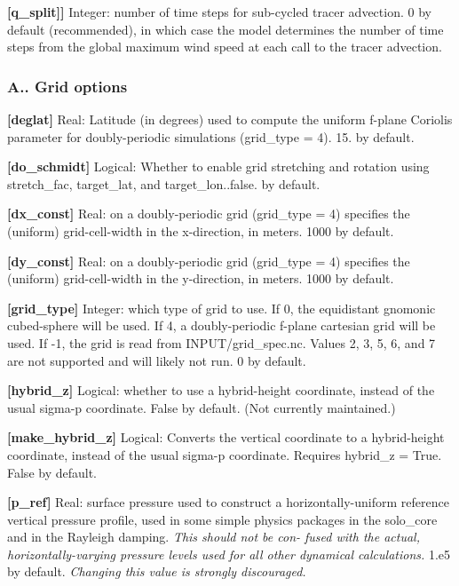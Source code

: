 {\bfseries \mbox{[}q\+\_\+split\mbox{]}\mbox{]}} Integer\+: number of time steps for sub-\/cycled tracer advection. 0 by default (recommended), in which case the model determines the number of time steps from the global maximum wind speed at each call to the tracer advection.

\subsubsection*{A.. Grid options}

{\bfseries \mbox{[}deglat\mbox{]}} Real\+: Latitude (in degrees) used to compute the uniform f-\/plane Coriolis parameter for doubly-\/periodic simulations (grid\+\_\+type = 4). 15. by default.

{\bfseries \mbox{[}do\+\_\+schmidt\mbox{]}} Logical\+: Whether to enable grid stretching and rotation using stretch\+\_\+fac, target\+\_\+lat, and target\+\_\+lon..false. by default.

{\bfseries \mbox{[}dx\+\_\+const\mbox{]}} Real\+: on a doubly-\/periodic grid (grid\+\_\+type = 4) specifies the (uniform) grid-\/cell-\/width in the x-\/direction, in meters. 1000 by default.

{\bfseries \mbox{[}dy\+\_\+const\mbox{]}} Real\+: on a doubly-\/periodic grid (grid\+\_\+type = 4) specifies the (uniform) grid-\/cell-\/width in the y-\/direction, in meters. 1000 by default.

{\bfseries \mbox{[}grid\+\_\+type\mbox{]}} Integer\+: which type of grid to use. If 0, the equidistant gnomonic cubed-\/sphere will be used. If 4, a doubly-\/periodic f-\/plane cartesian grid will be used. If -\/1, the grid is read from I\+N\+P\+U\+T/grid\+\_\+spec.\+nc. Values 2, 3, 5, 6, and 7 are not supported and will likely not run. 0 by default.

{\bfseries \mbox{[}hybrid\+\_\+z\mbox{]}} Logical\+: whether to use a hybrid-\/height coordinate, instead of the usual sigma-\/p coordinate. False by default. (Not currently maintained.)

{\bfseries \mbox{[}make\+\_\+hybrid\+\_\+z\mbox{]}} Logical\+: Converts the vertical coordinate to a hybrid-\/height coordinate, instead of the usual sigma-\/p coordinate. Requires hybrid\+\_\+z = True. False by default.

{\bfseries \mbox{[}p\+\_\+ref\mbox{]}} Real\+: surface pressure used to construct a horizontally-\/uniform reference vertical pressure profile, used in some simple physics packages in the solo\+\_\+core and in the Rayleigh damping. {\itshape This should not be con-\/ fused with the actual, horizontally-\/varying pressure levels used for all other dynamical calculations.} 1.\+e5 by default. {\itshape Changing this value is strongly discouraged.}

